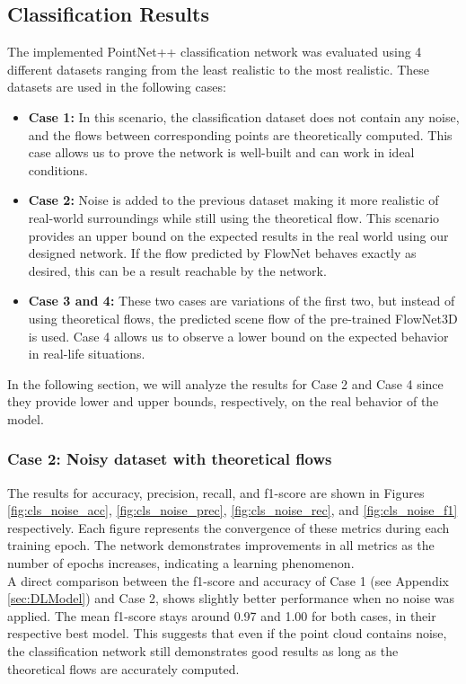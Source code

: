 \subsection{Classification Results}
\label{classResult}
The implemented PointNet++ classification network was evaluated using 4 different datasets ranging from the least realistic to the most realistic. These datasets are used in the following cases:
\begin{itemize}
    \item \textbf{Case 1:} In this scenario, the classification dataset does not contain any noise, and the flows between corresponding points are theoretically computed. This case allows us to prove the network is well-built and can work in ideal conditions.
    \item \textbf{Case 2:} Noise is added to the previous dataset making it more realistic of real-world surroundings while still using the theoretical flow. This scenario provides an upper bound on the expected results in the real world using our designed network. If the flow predicted by FlowNet behaves exactly as desired, this can be a result reachable by the network.
    \item \textbf{Case 3 and 4:} These two cases are variations of the first two, but instead of using theoretical flows, the predicted scene flow of the pre-trained FlowNet3D is used. Case 4 allows us to observe a lower bound on the expected behavior in real-life situations.
\end{itemize}
In the following section, we will analyze the results for Case 2 and Case 4 since they provide lower and upper bounds, respectively, on the real behavior of the model.
\subsubsection{Case 2: Noisy dataset with theoretical flows}

The results for accuracy, precision, recall, and f1-score are shown in Figures \ref{fig:cls_noise_acc}, \ref{fig:cls_noise_prec}, \ref{fig:cls_noise_rec}, and \ref{fig:cls_noise_f1} respectively. Each figure represents the convergence of these metrics during each training epoch. The network demonstrates improvements in all metrics as the number of epochs increases, indicating a learning phenomenon.\\  

A direct comparison between the f1-score and accuracy of Case 1 (see Appendix \ref{sec:DLModel}) and Case 2, shows slightly better performance when no noise was applied. The mean f1-score stays around 0.97 and 1.00  for both cases, in their respective best model. This suggests that even if the point cloud contains noise, the classification network still demonstrates good results as long as the theoretical flows are accurately computed.\\

